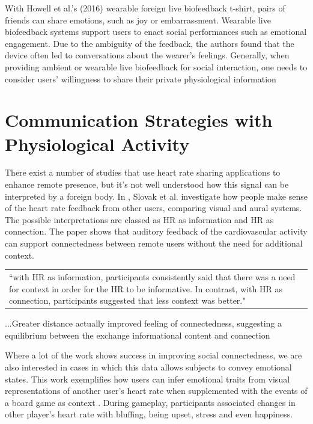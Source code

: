 With Howell et al.’s (2016) wearable foreign live biofeedback t-shirt, pairs of friends can share emotions, such as joy or embarrassment. Wearable live biofeedback systems support users to enact social performances such as emotional engagement. Due to the ambiguity of the feedback, the authors found that the device often led to conversations about the wearer’s feelings. Generally, when providing ambient or wearable live biofeedback for social interaction, one  needs to consider users’ willingness to share their private physiological information 

\section{Communication Strategies with Physiological Activity}
\label{lit_review:biosignals_sharing}

There exist a number of studies that use heart rate sharing applications to enhance remote presence, but it's not well understood how this signal can be interpreted by a foreign body. In \cite{slovak_understanding_2012}, Slovak et al. investigate how people make sense of the heart rate feedback from other users, comparing visual and aural systems. The possible interpretations are classed as HR as information and HR as connection. The paper shows that auditory feedback of the cardiovascular activity can support connectedness between remote users without the need for additional context.  

\begin{center}
\begin{tabular}{|p{13cm}}
“with HR as information, participants consistently said that there was a need for context in order for the HR to be informative.  In contrast, with HR as connection, participants suggested that less context was better." 
\end{tabular}
\end{center}

...Greater distance actually improved feeling of connectedness, suggesting a equilibrium between the exchange informational content and connection 

Where a lot of the work shows success in improving social connectedness, we are also interested in cases in which this data allows subjects to convey emotional states. This work exemplifies how users can infer emotional traits from visual representations of another user's heart rate when supplemented with the events of a board game as context \cite{frey_remote_2016}. During gameplay, participants associated changes in other player's heart rate with bluffing, being upset, stress and even happiness. 

